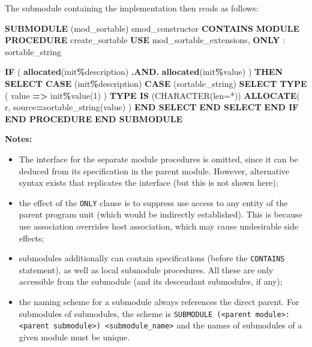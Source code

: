 \documentclass[
  paper=a4,
  ,captions=tableheading
]{scrartcl}
\newenvironment{Shaded}{\begin{snugshade}}{\end{snugshade}}
\newcommand{\DataTypeTok}[1]{\textcolor[rgb]{0.13,0.29,0.53}{#1}}
\newcommand{\DecValTok}[1]{\textcolor[rgb]{0.00,0.00,0.81}{#1}}
\newcommand{\FunctionTok}[1]{\textcolor[rgb]{0.13,0.29,0.53}{\textbf{#1}}}
\newcommand{\KeywordTok}[1]{\textcolor[rgb]{0.13,0.29,0.53}{\textbf{#1}}}
\newcommand{\NormalTok}[1]{#1}
\newcommand{\OperatorTok}[1]{\textcolor[rgb]{0.81,0.36,0.00}{\textbf{#1}}}
\newcommand{\StringTok}[1]{\textcolor[rgb]{0.31,0.60,0.02}{#1}}
\providecommand{\tightlist}{%
  \setlength{\itemsep}{0pt}\setlength{\parskip}{0pt}}
\begin{document}
The submodule containing the implementation then reads as follows:

\begin{Shaded}
\begin{Highlighting}[]
\KeywordTok{SUBMODULE}\NormalTok{ (mod\_sortable) smod\_constructor}
\KeywordTok{CONTAINS}
   \KeywordTok{MODULE PROCEDURE}\NormalTok{ create\_sortable}
      \KeywordTok{USE}\NormalTok{ mod\_sortable\_extensions, }\KeywordTok{ONLY}\NormalTok{ : sortable\_string}

      \KeywordTok{IF}\NormalTok{ ( }\FunctionTok{allocated}\NormalTok{(init}\OperatorTok{\%}\NormalTok{description) }\OperatorTok{.AND.} \FunctionTok{allocated}\NormalTok{(init}\OperatorTok{\%}\DataTypeTok{value}\NormalTok{) ) }\KeywordTok{THEN}
         \KeywordTok{SELECT CASE}\NormalTok{ (init}\OperatorTok{\%}\NormalTok{description)}
         \KeywordTok{CASE}\NormalTok{ (}\StringTok{\textquotesingle{}sortable\_string\textquotesingle{}}\NormalTok{)}
            \KeywordTok{SELECT TYPE}\NormalTok{ ( }\DataTypeTok{value} \KeywordTok{=}\OperatorTok{\textgreater{}}\NormalTok{ init}\OperatorTok{\%}\DataTypeTok{value}\NormalTok{(}\DecValTok{1}\NormalTok{) )}
            \KeywordTok{TYPE IS}\NormalTok{ (}\DataTypeTok{CHARACTER(len=*)}\NormalTok{)}
               \KeywordTok{ALLOCATE}\NormalTok{( r, source}\KeywordTok{=}\NormalTok{sortable\_string(}\DataTypeTok{value}\NormalTok{) )}
            \KeywordTok{END SELECT}
         \KeywordTok{END SELECT}
      \KeywordTok{END IF}
   \KeywordTok{END PROCEDURE}
\KeywordTok{END SUBMODULE}
\end{Highlighting}
\end{Shaded}

\textbf{Notes:}

\begin{itemize}
\tightlist
\item
  The interface for the separate module procedures is omitted, since it
  can be deduced from its specification in the parent module. However,
  alternative syntax exists that replicates the interface (but this is
  not shown here);
\item
  the effect of the \texttt{ONLY} clause is to suppress use access to
  any entity of the parent program unit (which would be indirectly
  established). This is because use association overrides host
  association, which may cause undesirable side effects;
\item
  submodules additionally can contain specifications (before the
  \texttt{CONTAINS} statement), as well as local submodule procedures.
  All these are only accessible from the submodule (and its descendant
  submodules, if any);
\item
  the naming scheme for a submodule always references the direct parent.
  For submodules of submodules, the scheme is
  \texttt{SUBMODULE\ (\textless{}parent\ module\textgreater{}:\textless{}parent\ submodule\textgreater{})\ \textless{}submodule\_name\textgreater{}}
  and the names of submodules of a given module must be unique.
\end{itemize}
\end{document}
